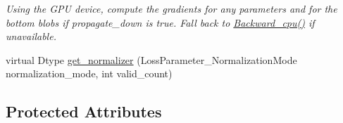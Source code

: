 \begin{DoxyCompactItemize}
\begin{DoxyCompactList}\small\item\em Using the G\+PU device, compute the gradients for any parameters and for the bottom blobs if propagate\+\_\+down is true. Fall back to \hyperlink{classcaffe_1_1SigmoidCrossEntropyLossLayer_a66ca156e1b45f62b0cd2f450ce7af7ec}{Backward\+\_\+cpu()} if unavailable. \end{DoxyCompactList}\item 
virtual Dtype \hyperlink{classcaffe_1_1SigmoidCrossEntropyLossLayer_af8ce9b84227c0be01d4a1cc248a7aa52}{get\+\_\+normalizer} (Loss\+Parameter\+\_\+\+Normalization\+Mode normalization\+\_\+mode, int valid\+\_\+count)
\end{DoxyCompactItemize}
\subsection*{Protected Attributes}
